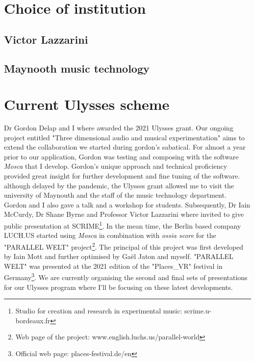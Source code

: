 \documentclass[journal,onecolumn]{IEEEtran}
\begin{document}
\section{Choice of institution} %
\subsection{Victor Lazzarini}
\subsection{Maynooth music technology}

\section{Current Ulysses scheme} %
Dr Gordon Delap and I where awarded the 2021 Ulysses grant. Our ongoing project entitled "Three dimensional audio and musical experimentation" aims to extend the collaboration we started during gordon's sabatical. For almost a year prior to our application, Gordon was testing and composing with the software \textit{Mosca}\cite{mott:mosca} that I develop. Gordon's unique approach and technical proficiency provided great insight for further development and fine tuning of the software. although delayed by the pandemic, the Ulysses grant allowed me to visit the university of Maynouth and the staff of the music technology department. Gordon and I also gave a talk and a workshop for students. Subsequently, Dr Iain McCurdy, Dr Shane Byrne and Professor Victor Lazzarini where invited to give public presentation at SCRIME\footnote{Studio for creation and research in experimental music: scrime.u-bordeaux.fr}. In the mean time, the Berlin based company LUCH.US started using \textit{Mosca} in combination with \textit{ossia score} for the "PARALLEL WELT" project\footnote{Web page of the project: www.english.luchs.us/parallel-world}. The principal of this project was first developed by Iain Mott\cite{mott:botanica} and further optimised by Gaël Jaton and myself\cite{jaton:moscanica}. "PARALLEL WELT" was presented at the 2021 edition of the "Places\_VR" festival in Germany\footnote{Official web page: places-festival.de/en}. We are currently organising the second and final sets of presentations for our Ulysses program where I'll be focusing on these latest developments.
\end{document}
